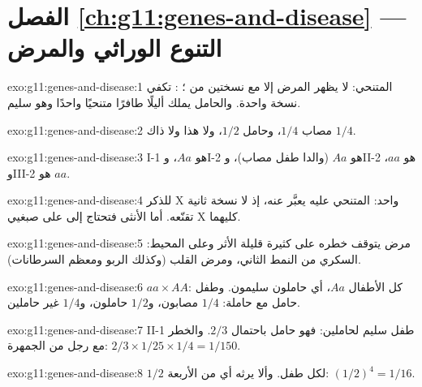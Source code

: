 \section*{الفصل \ref{ch:g11:genes-and-disease} --- التنوع الوراثي والمرض}

\begin{solution}{exo:g11:genes-and-disease:1}
المتنحي: لا يظهر المرض إلا مع نسختين من ؛ : تكفي نسخة
واحدة. والحامل يملك أليلًا طافرًا متنحيًا واحدًا وهو سليم.
\end{solution}

\begin{solution}{exo:g11:genes-and-disease:2}
مصاب $1/4$، وحامل $1/2$، ولا هذا ولا ذاك $1/4$.
\end{solution}

\begin{solution}{exo:g11:genes-and-disease:3}
I-1 هو $Aa$، وI-2 هو $Aa$ (والدا طفل مصاب)، وII-2 هو $aa$، وIII-2
هو $aa$.
\end{solution}

\begin{solution}{exo:g11:genes-and-disease:4}
للذكر  X واحد:  المتنحي عليه يعبَّر عنه، إذ لا نسخة ثانية
تقنّعه. أما الأنثى فتحتاج إلى  على صبغيي X كليهما.
\end{solution}

\begin{solution}{exo:g11:genes-and-disease:5}
مرض يتوقف خطره على  كثيرة قليلة الأثر وعلى المحيط: السكري من
النمط الثاني، ومرض القلب (وكذلك الربو ومعظم السرطانات).
\end{solution}

\begin{solution}{exo:g11:genes-and-disease:6}
$aa \times AA$: كل الأطفال $Aa$، أي حاملون سليمون. وطفل حامل مع حاملة:
$1/4$ مصابون، و$1/2$ حاملون، و$1/4$ غير حاملين.
\end{solution}

\begin{solution}{exo:g11:genes-and-disease:7}
II-1 طفل سليم لحاملين: فهو حامل باحتمال $2/3$. والخطر مع رجل من
الجمهرة: $2/3 \times 1/25 \times 1/4
= 1/150$.
\end{solution}

\begin{solution}{exo:g11:genes-and-disease:8}
$1/2$ لكل طفل. وألا يرثه أي من الأربعة: $(1/2)^4 = 1/16$.
\end{solution}

